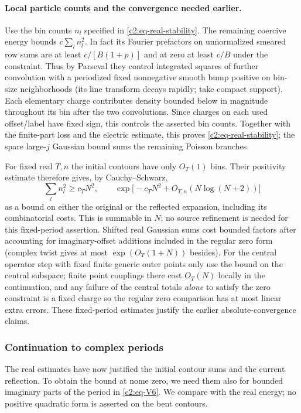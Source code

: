 \paragraph{Local particle counts and the convergence needed earlier.}
Use the bin counts \(n_l\) specified in
\eqref{c2:eq-real-stability}. The remaining coercive energy bounds
\(c\sum_l n_l^2\). In fact its Fourier prefactors on unnormalized smeared row sums are at least \(c/[B(1+p)]\) and at zero at least \(c/B\) under the constraint. Thus by Parseval they control integrated squares of further convolution with a periodized fixed nonnegative smooth bump positive on bin-size neighborhoods (its line transform decays rapidly; take compact support). Each elementary charge contributes density bounded below in magnitude throughout its bin after the two convolutions. Since charges on each used offset/label have fixed sign, this controls the asserted bin counts. Together with the finite-part loss and the electric estimate, this
proves \eqref{c2:eq-real-stability}; the spare large-\(j\) Gaussian
bound sums the remaining Poisson branches.

For fixed real \(T,n\) the initial contours have only \(O_T(1)\)
bins. Their positivity estimate therefore gives, by Cauchy--Schwarz,
\[
 \sum_l n_l^2\ge c_T N^2,
 \qquad
 \exp\big[-c_TN^2+O_{T,n}(N\log(N+2))\big]
\]
as a bound on either the original or the reflected expansion, including
its combinatorial costs. This is summable in \(N\); no source refinement
is needed for this fixed-period assertion. Shifted real Gaussian sums cost bounded factors after accounting for imaginary-offset additions included in the regular zero form (complex twist gives at most \(\exp(O_T(1+N))\) besides). For the central operator step with fixed finite generic outer points only use the bound on the central subspace; finite point couplings there cost \(O_{T}(N)\) locally in the continuation, and any failure of the central totals \emph{alone} to satisfy the zero constraint is a fixed charge so the regular zero comparison has at most linear extra errors. These fixed-period estimates justify the earlier absolute-convergence
claims.

\subsubsection{Continuation to complex periods}
The real estimates have now justified the initial contour sums and the
current reflection. To obtain the bound at nome zero, we need them also
for bounded imaginary parts of the period in \eqref{c2:eq-V6}. We compare
with the real energy; no positive quadratic form is asserted on the bent
contours.

